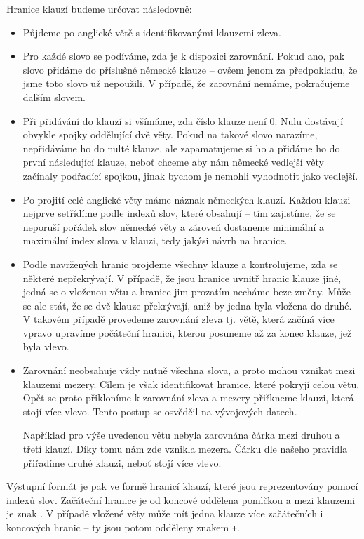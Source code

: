 \documentclass[12pt,a4paper]{report}
\begin{document}
Hranice klauzí budeme určovat následovně:
\begin{itemize}
\item{Půjdeme po anglické větě s identifikovanými klauzemi zleva.}
\item{Pro každé slovo se podíváme, zda je k dispozici zarovnání. Pokud ano, pak slovo přidáme do příslušné německé klauze -- ovšem jenom za předpokladu, že jsme toto slovo už nepoužili. V případě, že zarovnání nemáme, pokračujeme dalším slovem.}
\item{Při přidávání do klauzí si všímáme, zda číslo klauze není 0. Nulu dostávají obvykle spojky oddělující dvě věty. Pokud na takové slovo narazíme, nepřidáváme ho do nulté klauze, ale zapamatujeme si ho a přidáme ho do první následující klauze, neboť chceme aby nám německé vedlejší věty začínaly podřadící spojkou, jinak bychom je nemohli vyhodnotit jako vedlejší.}
\item{Po projití celé anglické věty máme náznak německých klauzí. Každou klauzi nejprve setřídíme podle indexů slov, které obsahují -- tím zajistíme, že se neporuší pořádek slov německé věty a zároveň dostaneme minimální a maximální index slova v klauzi, tedy jakýsi návrh na hranice.}
\item{Podle navržených hranic projdeme všechny klauze a kontrolujeme, zda se některé nepřekrývají. V případě, že jsou hranice uvnitř hranic klauze jiné, jedná se o vloženou větu a hranice jim prozatím necháme beze změny. Může se ale stát, že se dvě klauze překrývají, aniž by jedna byla vložena do druhé. V takovém případě provedeme zarovnání zleva tj. větě, která začíná více vpravo upravíme počáteční hranici, kterou posuneme až za konec klauze, jež byla vlevo.}
\item{Zarovnání neobsahuje vždy nutně všechna slova, a proto mohou vznikat mezi klauzemi mezery. Cílem je však identifikovat hranice, které pokryjí celou větu. Opět se proto přikloníme k zarovnání zleva a mezery přiřkneme klauzi, která stojí více vlevo. Tento postup se osvědčil na vývojových datech.}

Například pro výše uvedenou větu nebyla zarovnána čárka mezi druhou a třetí klauzí. Díky tomu nám zde vznikla mezera. Čárku dle našeho pravidla přiřadíme druhé klauzi, neboť stojí více vlevo.
\end{itemize}

Výstupní formát je pak ve formě hranicí klauzí, které jsou reprezentovány pomocí indexů slov. Začáteční hranice je od koncové oddělena pomlčkou a mezi klauzemi je znak \texttt{\textbar}. V případě vložené věty může mít jedna klauze více začátečních i koncových hranic -- ty jsou potom odděleny znakem \texttt{+}.
\end{document}

